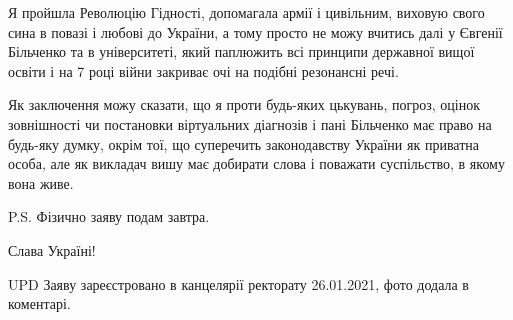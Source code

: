 Я пройшла Революцію Гідності, допомагала армії і цивільним, виховую свого сина
в повазі і любові до України, а тому просто не можу вчитись далі у Євгенії
Більченко та в університеті, який паплюжить всі принципи державної вищої освіти
і на 7 році війни закриває очі на подібні резонансні речі. 

Як заключення можу сказати, що я проти будь-яких цькувань, погроз, оцінок
зовнішності чи постановки віртуальних діагнозів і пані Більченко має право на
будь-яку думку, окрім тої, що суперечить законодавству України як приватна
особа, але як викладач вишу має добирати слова і поважати суспільство, в якому
вона живе. 

P.S. Фізично заяву подам завтра. 

Слава Україні! 

UPD Заяву зареєстровано в канцелярії ректорату 26.01.2021, фото додала в коментарі.
